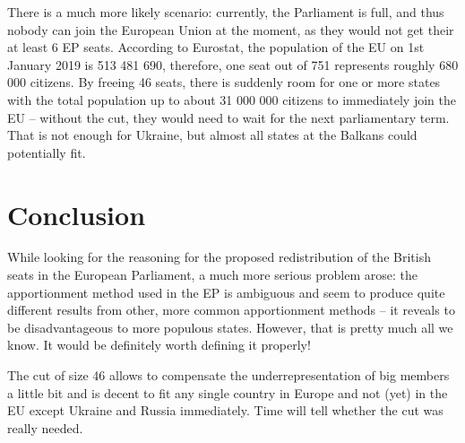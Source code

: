 \documentclass[a4paper]{article}
\theoremstyle{definition}
\begin{document}
There is a much more likely scenario: currently, the Parliament is full, and thus nobody can join the European Union at the moment, as they would not get their at least 6 EP seats. According to Eurostat, the population of the EU on 1st January 2019 is 513 481 690, therefore, one seat out of 751 represents roughly 680 000 citizens. By freeing 46 seats, there is suddenly room for one or more states with the total population up to about 31 000 000 citizens to immediately join the EU -- without the cut, they would need to wait for the next parliamentary term. That is not enough for Ukraine, but almost all states at the Balkans could potentially fit.

\section{Conclusion}

While looking for the reasoning for the proposed redistribution of the British seats in the European Parliament, a much more serious problem arose: the apportionment method used in the EP is ambiguous and seem to produce quite different results from other, more common apportionment methods -- it reveals to be disadvantageous to more populous states. However, that is pretty much all we know. It would be definitely worth defining it properly!

The cut of size 46 allows to compensate the underrepresentation of big members a little bit and is decent to fit any single country in Europe and not (yet) in the EU except Ukraine and Russia immediately. Time will tell whether the cut was really needed.
\end{document}
